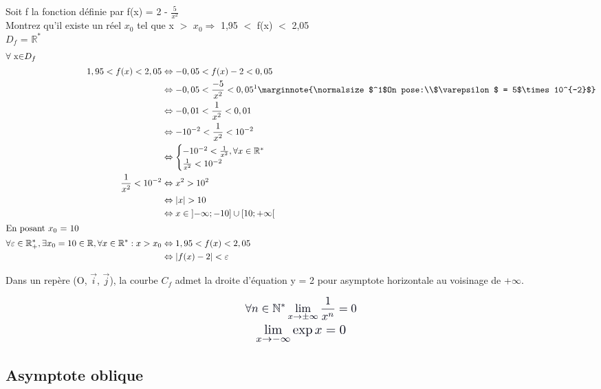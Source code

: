 \documentclass[a4paper, 10pt]{article}
\renewcommand{\large}{\color{text}}
\renewcommand{\textbf}{\color{crimson}}
\begin{document}
	\bigskip
	\textbf{\color{darkblue}Exemple:}
	\large Soit f la fonction définie par f(x) = 2 - $\frac{5}{x^2}$\\
	Montrez qu'il existe un réel $x_0$ tel que x $>$ $x_0 \Rightarrow$ 1,95 $<$ f(x) $<$ 2,05\\
	\newline
	$D_f$ = $\mathbb{R}^*$
	\begin{gather*}
		\begin{split}
			\shortintertext{$\forall$ x$\in$$D_f$}
			1,95 < f(x) < 2,05 &\Leftrightarrow -0,05 < f(x) - 2 < 0,05\\
			&\Leftrightarrow-0,05 < \frac{-5}{x^2} < 0,05^1
			\marginnote{\normalsize $^1$On pose:\\$\varepsilon$ = 5$\times10^{-2}$}
			\\
			&\Leftrightarrow-0,01 < \frac{1}{x^2} < 0,01\\
			&\Leftrightarrow -10^{-2} < \frac{1}{x^2}< 10^{-2}\\
			&\Leftrightarrow
			\begin{cases}
				-10^{-2} < \frac{1}{x^2}, \forall x\in\mathbb{R}^*\\
				\frac{1}{x^2} < 10^{-2}
			\end{cases}
			\\
			\frac{1}{x^2} < 10^{-2}&\Leftrightarrow x^2 > 10^2\\
			&\Leftrightarrow\lvert x\rvert > 10\\
			&\Leftrightarrow x\in \left]-\infty; -10\right] \cup \left[10; +\infty\right[\\
			\shortintertext{En posant $x_0$ = 10}
			\forall\varepsilon\in\mathbb{R}_{+}^{*},\exists x_0=10\in\mathbb{R},\forall x\in\mathbb{R}^*: x>x_0 &\Leftrightarrow 1,95 < f(x) < 2,05\\
			&\Leftrightarrow\lvert f(x) - 2\rvert < \varepsilon
		\end{split}
	\end{gather*}

	\textbf{Graph:}
	\large Dans un repère (O, $\vec{i}$, $\vec{j}$), la courbe $C_f$ admet la droite d'équation y = 2 pour asymptote horizontale au voisinage de +$\infty$.
	\vspace{0.8cm}
	
	\textbf{Propriétés:}
	\begin{gather}
		\color{text} \scaleto{\forall n\in\mathbb{N}^*\lim_{x\to\pm\infty}\frac{1}{x^n}=0}{25pt}\\
		\color{text} \scaleto{\lim_{x\to-\infty}\exp{x}=0}{20pt}
	\end{gather}
	\newpage

	\begin{center}
		\subsection*{Asymptote oblique}
	\end{center}

	
\end{document}
